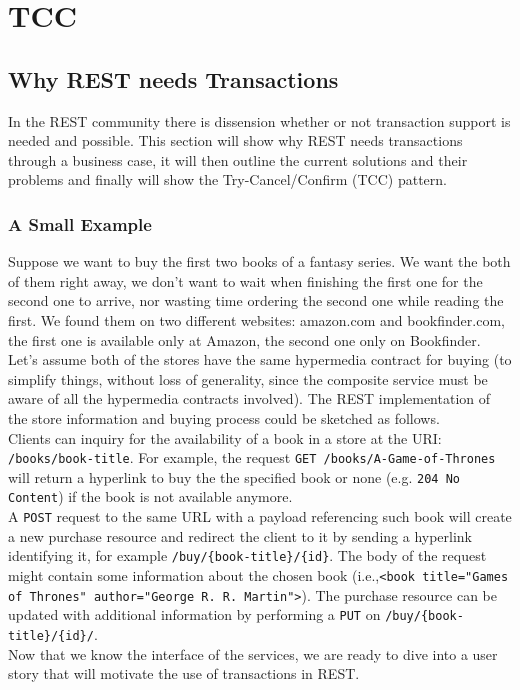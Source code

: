 \chapter{TCC}
\label{chapter-tcc}

\section{Why REST needs Transactions}
In the REST community there is dissension whether or not transaction support is needed and possible. This section will show why REST needs transactions through a business case, it will then outline the current solutions and their problems and finally will show the Try-Cancel/Confirm (TCC) pattern.\\
\subsection{A Small Example}
Suppose we want to buy the first two books of a fantasy series. We want the both of them right away, we don't want to wait when finishing the first one for the second one to arrive, nor wasting time ordering the second one while reading the first. We found them on two different websites: amazon.com and bookfinder.com, the first one is available only at Amazon, the second one only on Bookfinder. Let's assume both of the stores have the same hypermedia contract for buying (to simplify things, without loss of generality, since the composite service must be aware of all the hypermedia contracts involved). The REST implementation of the store information and buying process could be sketched as follows.\\
Clients can inquiry for the availability of a book in a store at the URI: {\tt /books/{book-title}}. For example, the request {\tt GET /books/A-Game-of-Thrones} will return a hyperlink to buy the the specified book or none (e.g. {\tt 204 No Content}) if the book is not available anymore.\\
A {\tt POST} request to the same URL with a payload referencing such book will create a new purchase resource and redirect the client to it by sending a hyperlink identifying it, for example {\tt /buy/\{book-title\}/\{id\}}. The body of the request might contain some information about the chosen book (i.e.,{\tt  <book title="Games of Thrones" author="George R. R. Martin">}). The purchase resource can be updated with additional information by performing a {\tt PUT} on {\tt /buy/\{book-title\}/\{id\}/}.\\
Now that we know the interface of the services, we are ready to dive into a user story that will motivate the use of transactions in REST.\\
